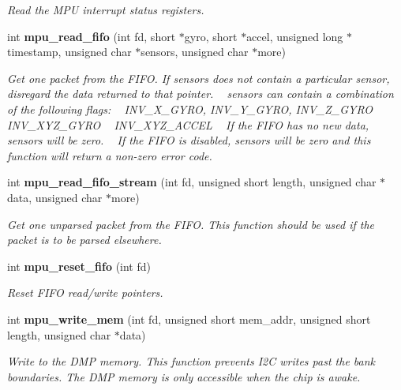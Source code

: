 \begin{DoxyCompactItemize}
\begin{DoxyCompactList}\small\item\em Read the M\+PU interrupt status registers. \end{DoxyCompactList}\item 
int \textbf{ mpu\+\_\+read\+\_\+fifo} (int fd, short $\ast$gyro, short $\ast$accel, unsigned long $\ast$timestamp, unsigned char $\ast$sensors, unsigned char $\ast$more)
\begin{DoxyCompactList}\small\item\em Get one packet from the F\+I\+FO. If {\itshape sensors} does not contain a particular sensor, disregard the data returned to that pointer. ~\newline
 {\itshape sensors} can contain a combination of the following flags\+: ~\newline
 I\+N\+V\+\_\+\+X\+\_\+\+G\+Y\+RO, I\+N\+V\+\_\+\+Y\+\_\+\+G\+Y\+RO, I\+N\+V\+\_\+\+Z\+\_\+\+G\+Y\+RO ~\newline
 I\+N\+V\+\_\+\+X\+Y\+Z\+\_\+\+G\+Y\+RO ~\newline
 I\+N\+V\+\_\+\+X\+Y\+Z\+\_\+\+A\+C\+C\+EL ~\newline
 If the F\+I\+FO has no new data, {\itshape sensors} will be zero. ~\newline
 If the F\+I\+FO is disabled, {\itshape sensors} will be zero and this function will return a non-\/zero error code. \end{DoxyCompactList}\item 
int \textbf{ mpu\+\_\+read\+\_\+fifo\+\_\+stream} (int fd, unsigned short length, unsigned char $\ast$data, unsigned char $\ast$more)
\begin{DoxyCompactList}\small\item\em Get one unparsed packet from the F\+I\+FO. This function should be used if the packet is to be parsed elsewhere. \end{DoxyCompactList}\item 
int \textbf{ mpu\+\_\+reset\+\_\+fifo} (int fd)
\begin{DoxyCompactList}\small\item\em Reset F\+I\+FO read/write pointers. \end{DoxyCompactList}\item 
int \textbf{ mpu\+\_\+write\+\_\+mem} (int fd, unsigned short mem\+\_\+addr, unsigned short length, unsigned char $\ast$data)
\begin{DoxyCompactList}\small\item\em Write to the D\+MP memory. This function prevents I2C writes past the bank boundaries. The D\+MP memory is only accessible when the chip is awake. \end{DoxyCompactList}\item 

\end{DoxyCompactItemize}

